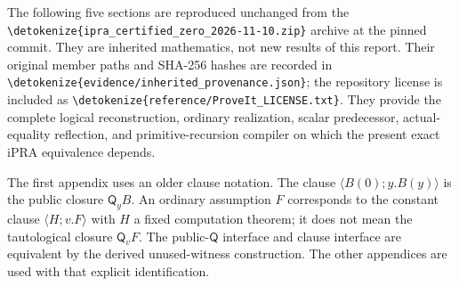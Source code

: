 \documentclass[11pt,letterpaper]{article}
\theoremstyle{definition}\newtheorem{definition}[theorem]{Definition}
\theoremstyle{remark}\newtheorem{remark}[theorem]{Remark}
\newcommand{\Q}{\mathsf Q}
\newcommand{\file}[1]{\expandafter\nolinkurl\expandafter{\detokenize{#1}}}
\begin{document}
The following five sections are reproduced unchanged from the
\file{ipra_certified_zero_2026-11-10.zip} archive at the pinned commit.
They are inherited mathematics, not new results of this report.
Their original member paths and SHA-256 hashes are recorded in
\file{evidence/inherited_provenance.json}; the repository license is included
as \file{reference/ProveIt_LICENSE.txt}. They provide the complete logical
reconstruction, ordinary realization, scalar predecessor, actual-equality
reflection, and primitive-recursion compiler on which the present exact
iPRA equivalence depends.\cite{certified}

The first appendix uses an older clause notation. The clause
$\langle B(0);y.B(y)\rangle$ is the public closure $\Q_yB$. An ordinary
assumption $F$ corresponds to the constant clause
$\langle H;v.F\rangle$ with $H$ a fixed computation theorem; it does not
mean the tautological closure $\Q_vF$. The public-$\Q$ interface and clause
interface are equivalent by the derived unused-witness construction.
The other appendices are used with that explicit identification.






\end{document}
